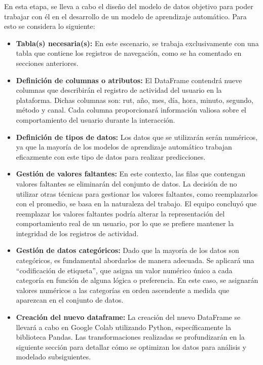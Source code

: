 En esta etapa, se lleva a cabo el diseño del modelo de datos objetivo para poder trabajar con él en el desarrollo de un modelo de aprendizaje automático. Para esto se considera lo siguiente:
\begin{itemize}
    \item  \textbf{Tabla(s) necesaria(s):} En este escenario, se trabaja exclusivamente con una tabla que contiene los registros de navegación, como se ha comentado en secciones anteriores.
    \item \textbf{Definición de columnas o atributos:} El DataFrame contendrá nueve columnas que describirán el registro de actividad del usuario en la plataforma. Dichas columnas son: rut, año, mes, día, hora, minuto, segundo, método y canal. Cada columna proporcionará información valiosa sobre el comportamiento del usuario durante la interacción.
    \item \textbf{Definición de tipos de datos:} Los datos que se utilizarán serán numéricos, ya que la mayoría de los modelos de aprendizaje automático trabajan eficazmente con este tipo de datos para realizar predicciones.
    \item \textbf{Gestión de valores faltantes:} En este contexto, las filas que contengan valores faltantes se eliminarán del conjunto de datos. La decisión de no utilizar otras técnicas para gestionar los valores faltantes, como reemplazarlos con el promedio, se basa en la naturaleza del trabajo. El equipo concluyó que reemplazar los valores faltantes podría alterar la representación del comportamiento real de un usuario, por lo que se prefiere mantener la integridad de los registros de actividad.
    \item \textbf{Gestión de datos categóricos:} Dado que la mayoría de los datos son categóricos, es fundamental abordarlos de manera adecuada. Se aplicará una \textquotedblleft codificación de etiqueta\textquotedblright, que asigna un valor numérico único a cada categoría en función de alguna lógica o preferencia. En este caso, se asignarán valores numéricos a las categorías en orden ascendente a medida que aparezcan en el conjunto de datos.
    \item \textbf{Creación del nuevo dataframe:} La creación del nuevo DataFrame se llevará a cabo en Google Colab utilizando Python, específicamente la biblioteca Pandas. Las transformaciones realizadas se profundizarán en la siguiente sección para detallar cómo se optimizan los datos para análisis y modelado subsiguientes.
\end{itemize}